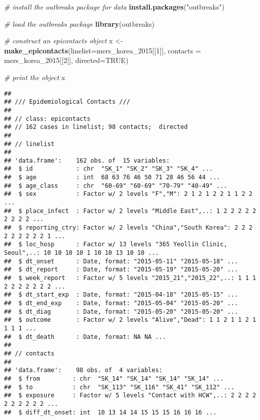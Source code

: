 \documentclass[9pt,a4paper,]{extarticle}
\newenvironment{Shaded}{\begin{snugshade}}{\end{snugshade}}
\newcommand{\KeywordTok}[1]{\textcolor[rgb]{0.13,0.29,0.53}{\textbf{#1}}}
\newcommand{\DataTypeTok}[1]{\textcolor[rgb]{0.13,0.29,0.53}{#1}}
\newcommand{\DecValTok}[1]{\textcolor[rgb]{0.00,0.00,0.81}{#1}}
\newcommand{\StringTok}[1]{\textcolor[rgb]{0.31,0.60,0.02}{#1}}
\newcommand{\CommentTok}[1]{\textcolor[rgb]{0.56,0.35,0.01}{\textit{#1}}}
\newcommand{\OtherTok}[1]{\textcolor[rgb]{0.56,0.35,0.01}{#1}}
\newcommand{\NormalTok}[1]{#1}
\theoremstyle{definition}
\theoremstyle{definition}
\theoremstyle{definition}
\theoremstyle{remark}
\begin{document}
\begin{Shaded}
\begin{Highlighting}[]
\CommentTok{# install the outbreaks package for data}
\KeywordTok{install.packages}\NormalTok{(}\StringTok{"outbreaks"}\NormalTok{)}
\end{Highlighting}
\end{Shaded}

\begin{Shaded}
\begin{Highlighting}[]
\CommentTok{# load the outbreaks package}
\KeywordTok{library}\NormalTok{(outbreaks)}

\CommentTok{# construct an epicontacts object}
\NormalTok{x <-}\StringTok{ }\KeywordTok{make_epicontacts}\NormalTok{(}\DataTypeTok{linelist=}\NormalTok{mers_korea_}\DecValTok{2015}\NormalTok{[[}\DecValTok{1}\NormalTok{]],}
                      \DataTypeTok{contacts =}\NormalTok{ mers_korea_}\DecValTok{2015}\NormalTok{[[}\DecValTok{2}\NormalTok{]],}
                      \DataTypeTok{directed=}\OtherTok{TRUE}\NormalTok{)}

\CommentTok{# print the object   }
\NormalTok{x               }
\end{Highlighting}
\end{Shaded}

\begin{verbatim}
## 
## /// Epidemiological Contacts ///
## 
## // class: epicontacts
## // 162 cases in linelist; 98 contacts;  directed 
## 
## // linelist
## 
## 'data.frame':    162 obs. of  15 variables:
##  $ id            : chr  "SK_1" "SK_2" "SK_3" "SK_4" ...
##  $ age           : int  68 63 76 46 50 71 28 46 56 44 ...
##  $ age_class     : chr  "60-69" "60-69" "70-79" "40-49" ...
##  $ sex           : Factor w/ 2 levels "F","M": 2 1 2 1 2 2 1 1 2 2 ...
##  $ place_infect  : Factor w/ 2 levels "Middle East",..: 1 2 2 2 2 2 2 2 2 2 ...
##  $ reporting_ctry: Factor w/ 2 levels "China","South Korea": 2 2 2 2 2 2 2 2 2 1 ...
##  $ loc_hosp      : Factor w/ 13 levels "365 Yeollin Clinic, Seoul",..: 10 10 10 10 1 10 10 13 10 10 ...
##  $ dt_onset      : Date, format: "2015-05-11" "2015-05-18" ...
##  $ dt_report     : Date, format: "2015-05-19" "2015-05-20" ...
##  $ week_report   : Factor w/ 5 levels "2015_21","2015_22",..: 1 1 1 2 2 2 2 2 2 2 ...
##  $ dt_start_exp  : Date, format: "2015-04-18" "2015-05-15" ...
##  $ dt_end_exp    : Date, format: "2015-05-04" "2015-05-20" ...
##  $ dt_diag       : Date, format: "2015-05-20" "2015-05-20" ...
##  $ outcome       : Factor w/ 2 levels "Alive","Dead": 1 1 2 1 1 2 1 1 1 1 ...
##  $ dt_death      : Date, format: NA NA ...
## 
## // contacts
## 
## 'data.frame':    98 obs. of  4 variables:
##  $ from         : chr  "SK_14" "SK_14" "SK_14" "SK_14" ...
##  $ to           : chr  "SK_113" "SK_116" "SK_41" "SK_112" ...
##  $ exposure     : Factor w/ 5 levels "Contact with HCW",..: 2 2 2 2 2 2 2 2 2 2 ...
##  $ diff_dt_onset: int  10 13 14 14 15 15 15 16 16 16 ...
\end{verbatim}
\end{document}
